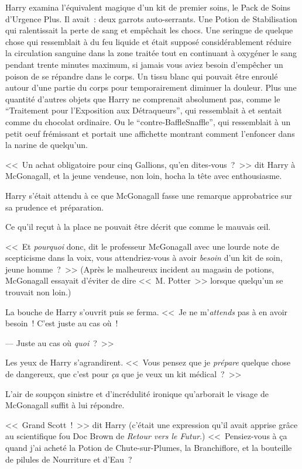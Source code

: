 Harry examina l'équivalent magique d'un kit de premier soins, le Pack de Soins d'Urgence Plus. Il avait~: deux garrots auto-serrants. Une Potion de Stabilisation qui ralentissait la perte de sang et empêchait les chocs. Une seringue de quelque chose qui ressemblait à du feu liquide et était supposé considérablement réduire la circulation sanguine dans la zone traitée tout en continuant à oxygéner le sang pendant trente minutes maximum, si jamais vous aviez besoin d'empêcher un poison de se répandre dans le corps. Un tissu blanc qui pouvait être enroulé autour d'une partie du corps pour temporairement diminuer la douleur. Plus une quantité d'autres objets que Harry ne comprenait absolument pas, comme le “Traitement pour l'Exposition aux Détraqueurs”, qui ressemblait à et sentait comme du chocolat ordinaire. Ou le “contre-BaffleSnaffle”, qui ressemblait à un petit oeuf frémissant et portait une affichette montrant comment l'enfoncer dans la narine de quelqu'un.

<<~Un achat obligatoire pour cinq Gallions, qu'en dites-vous~?~>> dit Harry à McGonagall, et la jeune vendeuse, non loin, hocha la tête avec enthousiasme.

Harry s'était attendu à ce que McGonagall fasse une remarque approbatrice sur sa prudence et préparation.

Ce qu'il reçut à la place ne pouvait être décrit que comme le mauvais œil.

<<~Et \emph{pourquoi} donc, dit le professeur McGonagall avec une lourde note de scepticisme dans la voix, vous attendriez-vous à avoir \emph{besoin} d'un kit de soin, jeune homme~?~>> (Après le malheureux incident au magasin de potions, McGonagall essayait d'éviter de dire <<~M. Potter~>> lorsque quelqu'un se trouvait non loin.)

La bouche de Harry s'ouvrit puis se ferma.
<<~Je ne m'\emph{attends} pas à en avoir besoin~! C'est juste au cas où~!

--- Juste au cas où \emph{quoi}~?~>>

Les yeux de Harry s'agrandirent. <<~Vous pensez que je \emph{prépare} quelque chose de dangereux, que c'est pour \emph{ça} que je veux un kit médical~?~>>

L'air de soupçon sinistre et d'incrédulité ironique qu'arborait le visage de McGonagall suffit à lui répondre.

<<~Grand Scott~!~>> dit Harry (c'était une expression qu'il avait apprise grâce au scientifique fou Doc Brown de \emph{Retour vers le Futur}.) <<~Pensiez-vous à ça quand j'ai acheté la Potion de Chute-sur-Plumes, la Branchiflore, et la bouteille de pilules de Nourriture et d'Eau~?

